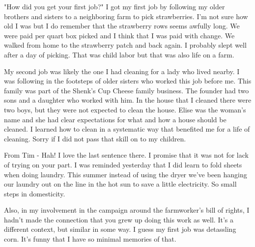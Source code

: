 "How did you get your first job?"
I got my first job by following my older brothers and sisters to a neighboring farm to pick strawberries.
I'm not sure how old I was but I do remember that the strawberry rows seems awfully long.
We were paid per quart box picked and I think that I was paid with change.
We walked from home to the strawberry patch and back again.
I probably slept well after a day of picking.
That was child labor but that was also life on a farm.

My second job was likely the one I had cleaning for a lady who lived nearby.
I was following in the footsteps of older sisters who worked this job before me.
This family was part of the Shenk's Cup Cheese family business.
The founder had two sons and a daughter who worked with him.
In the house that I cleaned there were two boys, but they were not expected to clean the house.
Elise was the woman's name and she had clear expectations for what and how a house should be cleaned.
I learned how to clean in a systematic way that benefited me for a life of cleaning.
Sorry if I did not pass that skill on to my children.

From Tim - Hah! I love the last sentence there.
I promise that it was not for lack of trying on your part.
I was reminded yesterday that I did learn to fold sheets when doing laundry.
This summer instead of using the dryer we've been hanging our laundry out on the line in the hot sun to save a little electricity.
So small steps in domesticity.

Also, in my involvement in the campaign around the farmworker's bill of rights, I hadn't made the connection that you grew up doing this work as well.
It's a different context, but similar in some way.
I guess my first job was detassling corn.
It's funny that I have so minimal memories of that.







